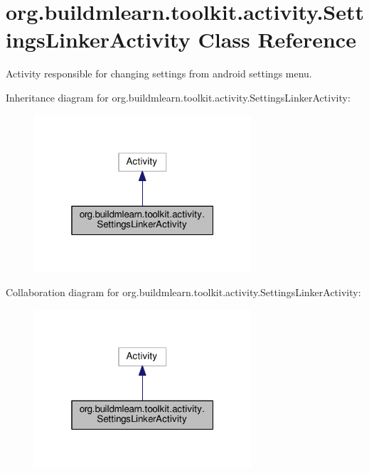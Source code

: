 \hypertarget{classorg_1_1buildmlearn_1_1toolkit_1_1activity_1_1SettingsLinkerActivity}{}\section{org.\+buildmlearn.\+toolkit.\+activity.\+Settings\+Linker\+Activity Class Reference}
\label{classorg_1_1buildmlearn_1_1toolkit_1_1activity_1_1SettingsLinkerActivity}


Activity responsible for changing settings from android settings menu.  




Inheritance diagram for org.\+buildmlearn.\+toolkit.\+activity.\+Settings\+Linker\+Activity\+:
\nopagebreak
\begin{figure}[H]
\begin{center}
\leavevmode
\includegraphics[width=229pt]{classorg_1_1buildmlearn_1_1toolkit_1_1activity_1_1SettingsLinkerActivity__inherit__graph}
\end{center}
\end{figure}


Collaboration diagram for org.\+buildmlearn.\+toolkit.\+activity.\+Settings\+Linker\+Activity\+:
\nopagebreak
\begin{figure}[H]
\begin{center}
\leavevmode
\includegraphics[width=229pt]{classorg_1_1buildmlearn_1_1toolkit_1_1activity_1_1SettingsLinkerActivity__coll__graph}
\end{center}
\end{figure}
